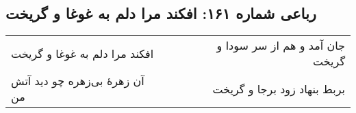 \begin{center}
\section*{رباعی شماره ۱۶۱: افکند مرا دلم به غوغا و گریخت}
\label{sec:0161}
\begin{longtable}{l p{0.5cm} r}
افکند مرا دلم به غوغا و گریخت
&&
جان آمد و هم از سر سودا و گریخت
\\
آن زهرهٔ بی‌زهره چو دید آتش من
&&
بربط بنهاد زود برجا و گریخت
\\
\end{longtable}
\end{center}
